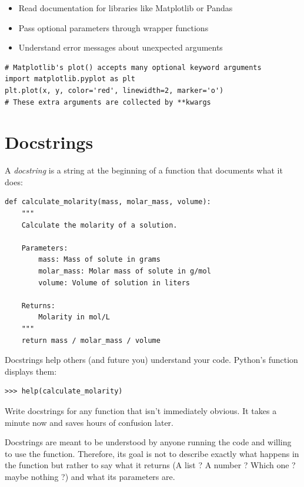 \begin{itemize}
    \item Read documentation for libraries like Matplotlib or Pandas
    \item Pass optional parameters through wrapper functions
    \item Understand error messages about unexpected arguments
\end{itemize}

\begin{lstlisting}
# Matplotlib's plot() accepts many optional keyword arguments
import matplotlib.pyplot as plt
plt.plot(x, y, color='red', linewidth=2, marker='o')
# These extra arguments are collected by **kwargs
\end{lstlisting}

\section{Docstrings}
\label{sec:docstrings}

A \emph{docstring} is a string at the beginning of a function that documents what it does:

\begin{lstlisting}
def calculate_molarity(mass, molar_mass, volume):
    """
    Calculate the molarity of a solution.

    Parameters:
        mass: Mass of solute in grams
        molar_mass: Molar mass of solute in g/mol
        volume: Volume of solution in liters

    Returns:
        Molarity in mol/L
    """
    return mass / molar_mass / volume
\end{lstlisting}

Docstrings help others (and future you) understand your code. Python's  function displays them:

\begin{lstlisting}
>>> help(calculate_molarity)
\end{lstlisting}

\begin{tip}
Write docstrings for any function that isn't immediately obvious. It takes a minute now and saves hours of confusion later.
\end{tip}

\begin{warning}
Docstrings are meant to be understood by anyone running the code and willing to use the function. Therefore, its goal is not to describe exactly what happens in the function but rather to say what it returns (A list ? A number ? Which one ? maybe nothing ?) and what its parameters are.
\end{warning}

